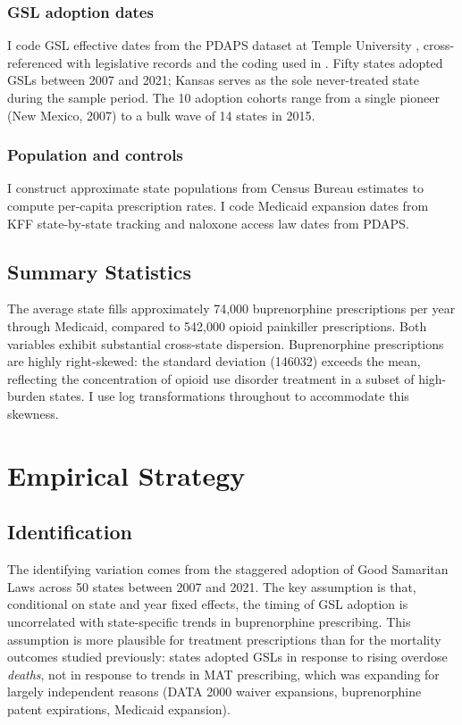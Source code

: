 \documentclass[12pt]{article}
\begin{document}
\subsubsection*{GSL adoption dates} I code GSL effective dates from the PDAPS dataset at Temple University \citep{pdaps2023}, cross-referenced with legislative records and the coding used in \citet{rees2019}. Fifty states adopted GSLs between 2007 and 2021; Kansas serves as the sole never-treated state during the sample period. The 10 adoption cohorts range from a single pioneer (New Mexico, 2007) to a bulk wave of 14 states in 2015.

\subsubsection*{Population and controls} I construct approximate state populations from Census Bureau estimates to compute per-capita prescription rates. I code Medicaid expansion dates from KFF state-by-state tracking and naloxone access law dates from PDAPS.

\subsection{Summary Statistics}



The average state fills approximately 74,000 buprenorphine prescriptions per year through Medicaid, compared to 542,000 opioid painkiller prescriptions. Both variables exhibit substantial cross-state dispersion. Buprenorphine prescriptions are highly right-skewed: the standard deviation (\num{146032}) exceeds the mean, reflecting the concentration of opioid use disorder treatment in a subset of high-burden states. I use log transformations throughout to accommodate this skewness.

\section{Empirical Strategy}

\subsection{Identification}

The identifying variation comes from the staggered adoption of Good Samaritan Laws across 50 states between 2007 and 2021. The key assumption is that, conditional on state and year fixed effects, the timing of GSL adoption is uncorrelated with state-specific trends in buprenorphine prescribing. This assumption is more plausible for treatment prescriptions than for the mortality outcomes studied previously: states adopted GSLs in response to rising overdose \textit{deaths}, not in response to trends in MAT prescribing, which was expanding for largely independent reasons (DATA 2000 waiver expansions, buprenorphine patent expirations, Medicaid expansion).
\end{document}
